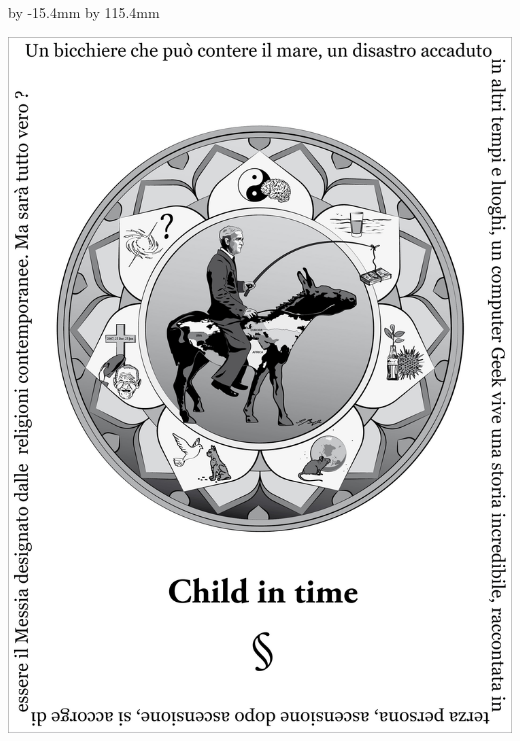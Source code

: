 \begin{titlepage}%
\begin{center}%
\newenvironment{changemargin}{%
\begin{list}{}{%
\setlength{\leftmargin}{-1in+1cm}%
\setlength{\rightmargin}{-1in+1cm}%
\setlength{\textwidth}{128mm}%
\setlength{\textheight}{190mm}%
}%
\item[]}{\end{list}}%
%
\advance\voffset by -15.4mm %
\advance\vsize by 115.4mm %
\begin{changemargin}%
\vspace*{\fill}%
\noindent\includegraphics[width=\textwidth]{copertina.jpg}%
\vspace*{\fill}%
\end{changemargin}%


\end{center}
\end{titlepage}
